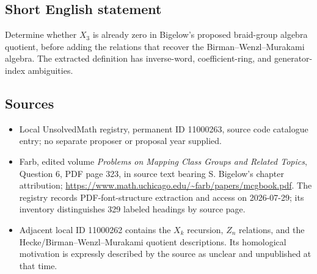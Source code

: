 \documentclass[11pt]{article}
\begin{document}
\subsection{Short English statement}
Determine whether $X_3$ is already zero in Bigelow's proposed braid-group algebra quotient, before adding the relations that recover the Birman--Wenzl--Murakami algebra. The extracted definition has inverse-word, coefficient-ring, and generator-index ambiguities.
\subsection{Sources}
\begin{itemize}
\item Local UnsolvedMath registry, permanent ID 11000263, source code catalogue entry; no separate proposer or proposal year supplied.
\item Farb, edited volume \emph{Problems on Mapping Class Groups and Related Topics}, Question 6, PDF page 323, in source text bearing S. Bigelow's chapter attribution; \url{https://www.math.uchicago.edu/~farb/papers/mcgbook.pdf}. The registry records PDF-font-structure extraction and access on 2026-07-29; its inventory distinguishes 329 labeled headings by source page.
\item Adjacent local ID 11000262 contains the $X_k$ recursion, $Z_n$ relations, and the Hecke/Birman--Wenzl--Murakami quotient descriptions. Its homological motivation is expressly described by the source as unclear and unpublished at that time.
\end{itemize}
\end{document}
